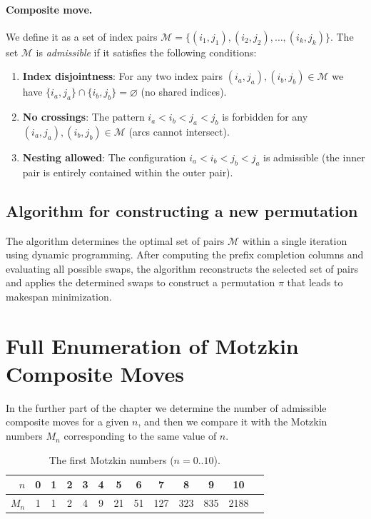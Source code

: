 \documentclass[runningheads]{llncs}
\begin{document}
\paragraph{Composite move.} We define it as a set of index pairs $\mathcal{M} = \{(i_1,j_1), (i_2,j_2), \ldots, (i_k,j_k)\}$. The set $\mathcal{M}$ is \emph{admissible} if it satisfies the following conditions:

\begin{enumerate}
  \item \textbf{Index disjointness}: For any two index pairs $(i_a,j_a), (i_b,j_b) \in \mathcal{M}$ we have $\{i_a,j_a\} \cap \{i_b,j_b\} = \varnothing$ (no shared indices).
  
  \item \textbf{No crossings}: The pattern $i_a < i_b < j_a < j_b$ is forbidden for any $(i_a,j_a), (i_b,j_b) \in \mathcal{M}$ (arcs cannot intersect).
  
  \item \textbf{Nesting allowed}: The configuration $i_a < i_b < j_b < j_a$ is admissible (the inner pair is entirely contained within the outer pair).
\end{enumerate}

\subsection{Algorithm for constructing a new permutation}
The algorithm determines the optimal set of pairs $\mathcal{M}$ within a single iteration using dynamic programming. After computing the prefix completion columns and evaluating all possible swaps, the algorithm reconstructs the selected set of pairs and applies the determined swaps to construct a permutation $\pi$ that leads to makespan minimization.

\section{Full Enumeration of Motzkin Composite Moves}
In the further part of the chapter we determine the number of admissible composite moves for a given $n$, and then we compare it with the Motzkin numbers $M_n$ corresponding to the same value of $n$.

\begin{table}[ht]
  \centering
  \caption{The first Motzkin numbers ($n=0..10$).}
  \begin{tabular}{@{}rcccccccccccc@{}}
    \toprule
    $n$ & 0 & 1 & 2 & 3 & 4 & 5 & 6 & 7 & 8 & 9 & 10 \\
    \midrule
    $M_n$ & 1 & 1 & 2 & 4 & 9 & 21 & 51 & 127 & 323 & 835 & 2188 \\
    \bottomrule
  \end{tabular}
\end{table}
 
\end{document}

